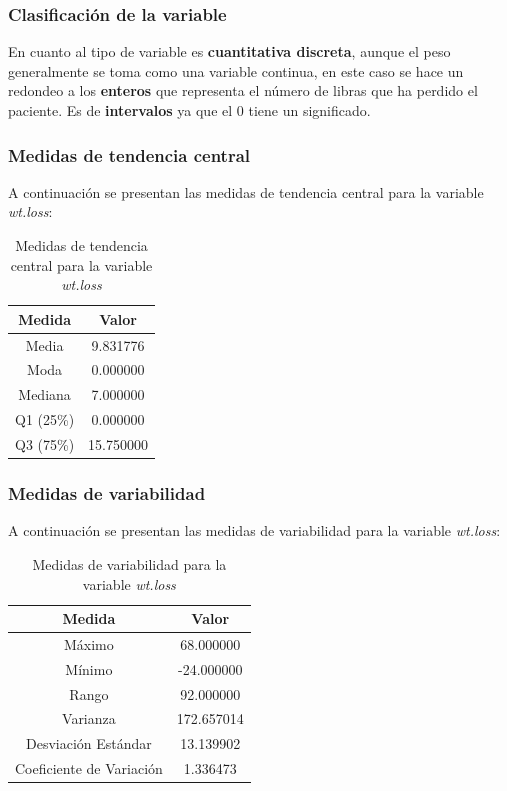 \documentclass[a4paper,12pt]{article}
\begin{document}
\subsubsection*{Clasificación de la variable}

En cuanto al tipo de variable es \textbf{cuantitativa discreta}, aunque el peso generalmente se toma como una variable continua, en este caso se hace un redondeo a los \textbf{enteros} que representa el número de libras que ha perdido el paciente. Es de \textbf{intervalos} ya que el 0 tiene un significado.

\subsubsection*{Medidas de tendencia central}

A continuación se presentan las medidas de tendencia central para la variable \textit{wt.loss}:

\begin{table}[h!]
    \centering
    \begin{tabular}{|c|c|}
        \hline
        \textbf{Medida} & \textbf{Valor} \\
        \hline
        Media & 9.831776 \\
        \hline
        Moda & 0.000000 \\
        \hline
        Mediana & 7.000000 \\
        \hline
        Q1 (25\%) & 0.000000 \\
        \hline
        Q3 (75\%) & 15.750000 \\
        \hline
    \end{tabular}
    \caption{Medidas de tendencia central para la variable \textit{wt.loss}}
    \label{tab:medidas_tendencia_central_wt_loss}
\end{table}

\subsubsection*{Medidas de variabilidad}

A continuación se presentan las medidas de variabilidad para la variable \textit{wt.loss}:

\begin{table}[h!]
    \centering
    \begin{tabular}{|c|c|}
        \hline
        \textbf{Medida} & \textbf{Valor} \\
        \hline
        Máximo & 68.000000 \\
        \hline
        Mínimo & -24.000000 \\
        \hline
        Rango & 92.000000 \\
        \hline
        Varianza & 172.657014 \\
        \hline
        Desviación Estándar & 13.139902 \\
        \hline
        Coeficiente de Variación & 1.336473 \\
        \hline
    \end{tabular}
    \caption{Medidas de variabilidad para la variable \textit{wt.loss}}
    \label{tab:medidas_variabilidad_wt_loss}
\end{table}
\end{document}
